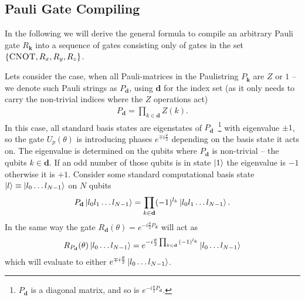 \subsection{Pauli Gate Compiling}
In the following we will derive the general formula to compile an arbitrary Pauli gate $R_\mathbf{k}$ into a sequence of gates consisting only of gates in the set $\left\{\textsc{CNOT}, R_x,R_y,R_z\right\}$.

Lets consider the case, when all Pauli-matrices in the Paulistring $P_\mathbf{k}$ are $Z$ or $1$ -- we denote such Pauli strings as $P_\mathbf{d}$, using $\mathbf{d}$ for the index set (as it only needs to carry the non-trivial indices where the $Z$ operations act)
\begin{align}
    P_\mathbf{d}= \prod_{k\in \mathbf{d}} Z(k).
\end{align}
In this case, all standard basis states are eigenstates of $P_\mathbf{d}$~\footnote{$P_\mathbf{d}$ is a diagonal matrix, and so is $e^{-i\frac{\theta}{2}P_\mathbf{d}}$.} with eigenvalue $\pm 1$, so the gate $U_p(\theta)$ is introducing phases $e^{\mp i \frac{\theta}{2}}$ depending on the basis state it acts on. The eigenvalue is determined on the qubits where $P_\mathbf{d}$ is non-trivial -- the qubits $k\in \mathbf{d}$. If an odd number of those qubits is in state $\ket{1}$ the eigenvalue is $-1$ otherwise it is $+1$. Consider some standard computational basis state $\ket{l} \equiv \ket{l_0\dots l_{N-1}}$ on $N$ qubits
\begin{align}
    P_\mathbf{d} \ket{l_0l_1\dots l_{N-1}} =  \prod_{k\in \mathbf{d}}(-1)^{l_k} \ket{l_0l_1\dots l_{N-1}}.
\end{align}
In the same way the gate $R_{\mathbf{d}}(\theta) = e^{-i\frac{\theta}{2}P_\mathbf{d}}$ will act as
\begin{align}
    R_{P_\mathbf{d}}(\theta) \ket{l_0\dots l_{N-1}} = e^{-i\frac{\theta}{2} \prod_{k\in \mathbf{d}}{}\left(-1\right)^{l_k}} \ket{l_0\dots l_{N-1}}
\end{align}
which will evaluate to either $e^{\mp i\frac{\theta}{2}}\ket{l_0\dots l_{N-1}}$.

